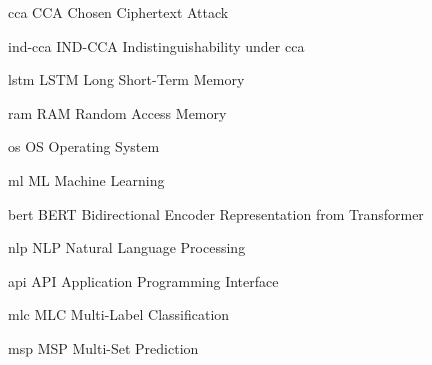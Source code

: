 \newacronym%
	{cca}
	{CCA}
	{Chosen Ciphertext Attack}

\newacronym%
	{ind-cca}
	{IND-CCA}
	{Indistinguishability under \acrlong{cca}}

\newacronym%
	{lstm}
	{LSTM}
	{Long Short-Term Memory}

\newacronym%
	{ram}
	{RAM}
	{Random Access Memory}

\newacronym%
	{os}
	{OS}
	{Operating System}

\newacronym%
	{ml}
	{ML}
	{Machine Learning}

\newacronym%
	{bert}
	{BERT}
	{Bidirectional Encoder Representation from Transformer}

\newacronym%
	{nlp}
	{NLP}
	{Natural Language Processing}

\newacronym%
	{api}
	{API}
	{Application Programming Interface}

\newacronym%
	{mlc}
	{MLC}
	{Multi-Label Classification}

\newacronym%
	{msp}
	{MSP}
	{Multi-Set Prediction}
